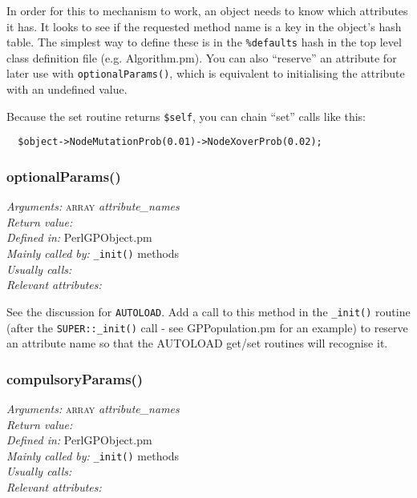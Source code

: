 \documentclass[a4paper]{article}
\begin{document}
In order for this to mechanism to work, an object needs to know which
attributes it has.  It looks to see if the requested method name is a
key in the object's hash table.  The simplest way to define these is
in the \texttt{\%defaults} hash in the top level class definition file
(e.g. Algorithm.pm).  You can also ``reserve'' an attribute for later
use with \texttt{optionalParams()}, which is equivalent to
initialising the attribute with an undefined value.

Because the set routine returns \texttt{\$self}, you can chain ``set''
calls like this:

\begin{verbatim}
  $object->NodeMutationProb(0.01)->NodeXoverProb(0.02);
\end{verbatim} %


\subsubsection{optionalParams()}
\begin{flushleft}
\textit{Arguments:} \textsc{array} \textit{attribute\_names} \\
\textit{Return value:} \\
\textit{Defined in:} PerlGPObject.pm\\
\textit{Mainly called by:} \texttt{\_init()} methods\\
\textit{Usually calls:} \\
\textit{Relevant attributes:}
\end{flushleft}

See the discussion for \texttt{AUTOLOAD}.  Add a call to this method
in the \texttt{\_init()} routine (after the \texttt{SUPER::\_init()}
call - see GPPopulation.pm for an example) to reserve an attribute
name so that the AUTOLOAD get/set routines will recognise it.

\subsubsection{compulsoryParams()}
\begin{flushleft}
\textit{Arguments:} \textsc{array} \textit{attribute\_names} \\
\textit{Return value:} \\
\textit{Defined in:} PerlGPObject.pm\\
\textit{Mainly called by:} \texttt{\_init()} methods\\
\textit{Usually calls:} \\
\textit{Relevant attributes:}
\end{flushleft}
\end{document}
